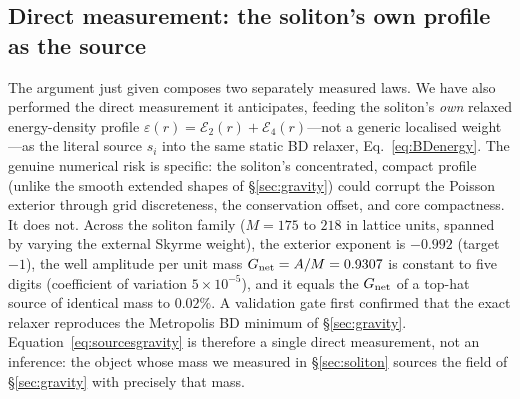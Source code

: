 \documentclass[aps,prd,reprint,nofootinbib,superscriptaddress,floatfix]{revtex4-2}
\theoremstyle{plain}
\begin{document}
\subsection{Direct measurement: the soliton's own profile as the source}
The argument just given composes two separately measured laws. We have also performed
the direct measurement it anticipates, feeding the soliton's \emph{own} relaxed
energy-density profile $\varepsilon(r)=\mathcal{E}_2(r)+\mathcal{E}_4(r)$---not a
generic localised weight---as the literal source $s_i$ into the same static BD relaxer,
Eq.~\eqref{eq:BDenergy}. The genuine numerical risk is specific: the soliton's
concentrated, compact profile (unlike the smooth extended shapes of
\S\ref{sec:gravity}) could corrupt the Poisson exterior through grid discreteness, the
conservation offset, and core compactness. It does not. Across the soliton family
($M=175$ to $218$ in lattice units, spanned by varying the external Skyrme weight), the
exterior exponent is $-0.992$ (target $-1$), the well amplitude per unit mass
$G_{\rm net}=A/M=0.9307$ is constant to five digits (coefficient of variation
$5\times10^{-5}$), and it equals the $G_{\rm net}$ of a top-hat source of identical mass
to $0.02\%$. A validation gate first confirmed that the exact relaxer reproduces the
Metropolis BD minimum of \S\ref{sec:gravity}. Equation~\eqref{eq:sourcesgravity} is
therefore a single direct measurement, not an inference: the object whose mass we
measured in \S\ref{sec:soliton} sources the field of \S\ref{sec:gravity} with precisely
that mass.
\end{document}
